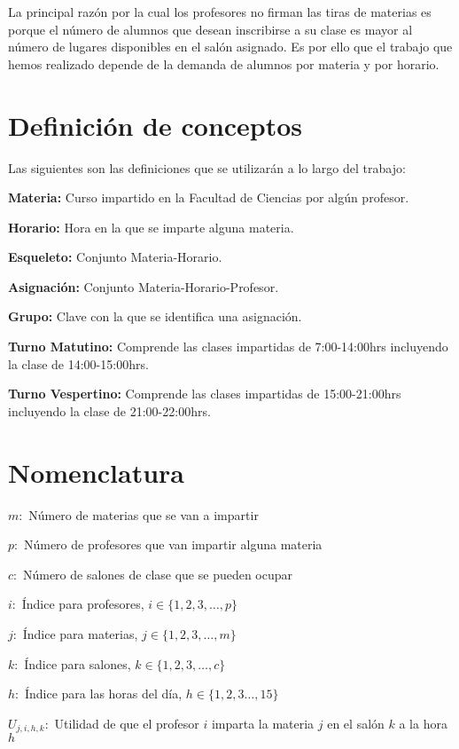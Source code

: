 La principal razón por la cual los profesores no firman las tiras de materias es porque el número de alumnos que desean inscribirse a su clase es mayor al número de lugares disponibles en el salón asignado. Es por ello que el trabajo que hemos realizado depende de la demanda de alumnos por materia y por horario.



\section{Definición de conceptos}

Las siguientes son las definiciones que se utilizarán a lo largo del trabajo:

\textbf{Materia:} Curso impartido en la Facultad de Ciencias por algún profesor.

\textbf{Horario:} Hora en la que se imparte alguna materia.

\textbf{Esqueleto:} Conjunto Materia-Horario.

\textbf{Asignación:} Conjunto Materia-Horario-Profesor.

\textbf{Grupo:} Clave con la que se identifica una asignación.

\textbf{Turno Matutino:} Comprende las clases impartidas de 7:00-14:00hrs incluyendo la clase de 14:00-15:00hrs.

\textbf{Turno Vespertino:} Comprende las clases impartidas de 15:00-21:00hrs incluyendo la clase de 21:00-22:00hrs.


\section{Nomenclatura}

$m:$ Número de materias que se van a impartir

$p:$ Número de profesores que van impartir alguna materia

$c:$ Número de salones de clase que se pueden ocupar

$i:$ Índice para profesores, $i \in \{ 1, 2, 3, \ldots, p \}$

$j:$ Índice para materias, $j \in \{ 1, 2, 3, \ldots, m \}$

$k:$ Índice para salones, $k \in \{ 1, 2, 3, \ldots, c \}$

$h:$ Índice para las horas del día, $h \in \{ 1, 2, 3 \ldots, 15\}$

$U_{j,i,h,k}:$ Utilidad de que el profesor $i$ imparta la materia $j$ en el salón $k$ a la hora $h$

